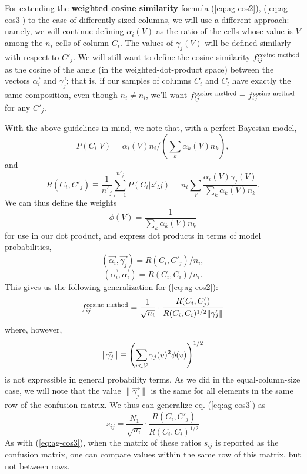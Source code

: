 \documentclass[12pt]{article}
\begin{document}
For extending the {\bf weighted cosine similarity} formula
(\ref{eq:ag-cos2}), (\ref{eq:ag-cos3}) to the case of differently-sized
columns, we will use a different approach: namely, we will continue
defining $\alpha_i(V)$ as the ratio of the cells whose value is $V$
among the $n_i$ cells of column $C_i$. The values of $\gamma_j(V)$
will be defined similarly with respect to $C'_j$. We will still want
to define the cosine similarity $f_{ij}^{\rm cosine \ method}$ as the
cosine of the angle (in the weighted-dot-product space) between the
vectors $\vec{\alpha_i}$ and $\vec{\gamma_j}$; that is, if our samples
of columns $C_i$ and $C_l$ have exactly the same composition, even
though $n_i \ne n_l$, we'll want $f_{lj}^{\rm cosine \ method} =
f_{ij}^{\rm cosine \ method}$ for any $C'_j$.

With the above guidelines in mind, we note that, with a perfect Bayesian model, 
$$P(C_i|V)=\alpha_i(V) n_i / (\sum_k \alpha_k(V) n_k),
$$
and
\begin{equation}
\label{eq:R-def2}
R(C_i,C'_j)\equiv \frac{1}{n'_j}\sum_{l=1}^{n'_j} P(C_i|z'_lj)  =
n_i \sum_V \frac{\alpha_i(V)\gamma_j(V)}{\sum_k \alpha_k(V) n_k}.
\end{equation}
We can thus define the weights 
$$
\phi(V) =  \frac{1}{\sum_k \alpha_k(V) n_k}
$$ for use in our dot product, and express dot products in terms of
model probabilities,
$$
(\vec{\alpha_i}, \vec{\gamma_j}) = R(C_i,C'_j)/n_i,
$$
$$
(\vec{\alpha_i}, \vec{\alpha_i}) = R(C_i,C_i)/n_i.
$$
This gives us the following generalization for (\ref{eq:ag-cos2}): 
\begin{equation}
\label{eq:ag-cos-gen-2}
f_{ij}^{\rm cosine \ method} =
\frac{1}{\sqrt{n_i}} \cdot 
\frac{ R(C_i,C'_j) }{ R(C_i,C_i)^{1/2} \|\vec{\gamma_j}\|}
\end{equation}
where, however,
$$
\|\vec{\gamma_j}\| \equiv \left(\sum_{v\in \cal{V}}{\gamma_j(v)^2  \phi(v)}\right)^{1/2}
$$ is not expressible in general probability terms. As we did in the
equal-column-size case, we will note that the value
$\|\vec{\gamma_j}\|$ is the same for all elements in the same row of
the confusion matrix. We thus can generalize eq. (\ref{eq:ag-cos3}) as
\begin{equation}
\label{eq:ag-cos-gen-3}
s_{ij} = \frac{N_1}{\sqrt{n_i}} \cdot 
 \frac{ R(C_i,C'_j) }{ R(C_i,C_i)^{1/2} }
\end{equation}
As with (\ref{eq:ag-cos3}), when the matrix of these ratios $s_{ij}$
is reported as the confusion matrix, one can compare values within the
same row of this matrix, but not between rows. 
\end{document}
